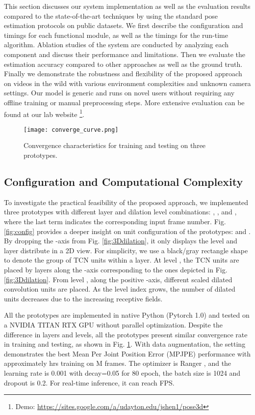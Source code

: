 \documentclass[twocolumn]{svjour3}          \smartqed  \usepackage{graphicx}
\begin{document}
This section discusses our system implementation as well as the evaluation results compared to the state-of-the-art techniques by using the standard pose estimation protocols on public datasets.  We first describe the configuration and timings for each functional module, as well as the timings for the run-time algorithm. Ablation studies of the system are conducted by analyzing each component and discuss their performance and limitations. Then we evaluate the estimation accuracy compared to other approaches as well as the ground truth. Finally we  demonstrate the robustness and flexibility of the proposed approach on videos in the wild with various environment complexities and unknown camera settings. Our model is generic and runs on novel users without requiring any offline training or manual preprocessing steps. More extensive evaluation can be found at our lab website \footnote{Demo: \url{https://sites.google.com/a/udayton.edu/jshen1/pose3d}}.

\begin{figure}[ht]
  \texttt{[image: converge\_curve.png]}
  \caption{Convergence characteristics for training and testing on three prototypes.}\label{fig:converge}
\end{figure}

\subsection{Configuration and Computational Complexity}
To investigate the practical feasibility of the proposed approach, we implemented three prototypes with different layer  and dilation level  combinations: , , and , where the last term   indicates the corresponding input frame number. Fig. \ref{fig:config} provides a deeper insight on unit configuration of the prototypes:  and . By dropping the -axis from Fig. \ref{fig:3Ddilation}, it only displays the level and layer distribute in a 2D view. For simplicity, we use a black/gray rectangle shape to denote the group of TCN units within a layer. At level  , the TCN units are placed by layers along the -axis corresponding to the ones depicted in Fig. \ref{fig:3Ddilation}.  From level ,  along the positive -axis, different scaled dilated convolution units are placed. As the level index grows, the number of dilated units decreases due to the increasing receptive fields. 


All the prototypes are implemented in native Python (Pytorch 1.0) and tested on a NVIDIA TITAN RTX GPU  without parallel optimization. Despite the difference in layers and levels, all the prototypes present similar convergence rate in training and testing, as shown in Fig. \ref{fig:converge}. With data augmentation, the  setting demonstrates the best Mean Per Joint Position Error (MPJPE) performance with approximately  hrs training on M frames. The optimizer is Ranger \citep{zhang2019lookahead,liu2019variance}, and the learning rate is 0.001 with decay=0.05 for 80 epoch, the batch size is 1024 and dropout is 0.2. For real-time inference, it can reach  FPS. 
\end{document}
